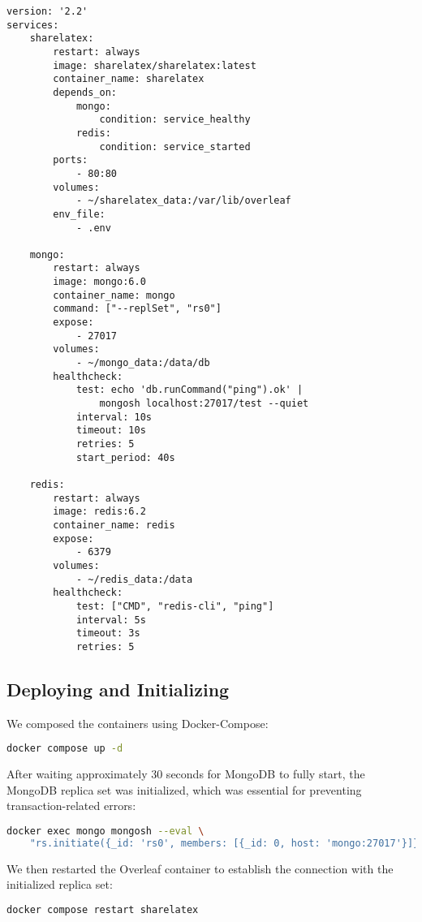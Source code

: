 \begin{verbatim}
version: '2.2'
services:
    sharelatex:
        restart: always
        image: sharelatex/sharelatex:latest
        container_name: sharelatex
        depends_on:
            mongo:
                condition: service_healthy
            redis:
                condition: service_started
        ports:
            - 80:80
        volumes:
            - ~/sharelatex_data:/var/lib/overleaf
        env_file:
            - .env

    mongo:
        restart: always
        image: mongo:6.0
        container_name: mongo
        command: ["--replSet", "rs0"]
        expose:
            - 27017
        volumes:
            - ~/mongo_data:/data/db
        healthcheck:
            test: echo 'db.runCommand("ping").ok' | 
                mongosh localhost:27017/test --quiet
            interval: 10s
            timeout: 10s
            retries: 5
            start_period: 40s

    redis:
        restart: always
        image: redis:6.2
        container_name: redis
        expose:
            - 6379
        volumes:
            - ~/redis_data:/data
        healthcheck:
            test: ["CMD", "redis-cli", "ping"]
            interval: 5s
            timeout: 3s
            retries: 5
\end{verbatim}

\subsection{Deploying and Initializing}

We composed the containers using Docker-Compose:

\begin{lstlisting}[language=bash]
docker compose up -d
\end{lstlisting}

After waiting approximately 30 seconds for MongoDB to fully start, the MongoDB replica set was initialized, which was essential for preventing transaction-related errors:

\begin{lstlisting}[language=bash]
docker exec mongo mongosh --eval \
    "rs.initiate({_id: 'rs0', members: [{_id: 0, host: 'mongo:27017'}]})"
\end{lstlisting}

We then restarted the Overleaf container to establish the connection with the initialized replica set:

\begin{lstlisting}[language=bash]
docker compose restart sharelatex
\end{lstlisting}

